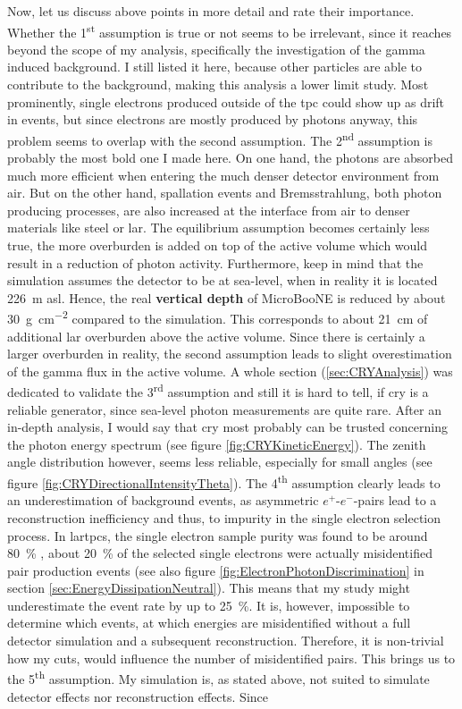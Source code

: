 Now, let us discuss above points in more detail and rate their importance. Whether the 1\textsuperscript{st} assumption is true or not seems to be irrelevant, since it reaches beyond the scope of my analysis, specifically the investigation of the gamma induced background. I still listed it here, because other particles are able to contribute to the background, making this analysis a lower limit study. Most prominently, single electrons produced outside of the \gls{tpc} could show up as drift in events, but since electrons are mostly produced by photons anyway, this problem seems to overlap with the second assumption. The 2\textsuperscript{nd} assumption is probably the most bold one I made here. On one hand, the photons are absorbed much more efficient when entering the much denser detector environment from air. But on the other hand, spallation events and Bremsstrahlung, both photon producing processes, are also increased at the interface from air to denser materials like steel or \gls{lar}. The equilibrium assumption becomes certainly less true, the more overburden is added on top of the active volume which would result in a reduction of photon activity. Furthermore, keep in mind that the simulation assumes the detector to be at sea-level, when in reality it is located \SI{226}{\metre} \gls{asl}. Hence, the real \textbf{vertical depth} of MicroBooNE is reduced by about \SI{30}{\gram\per\centi\metre\squared} compared to the simulation. This corresponds to about \SI{21}{\centi\metre} of additional \gls{lar} overburden above the active volume. Since there is certainly a larger overburden in reality, the second assumption leads to slight overestimation of the gamma flux in the active volume. A whole section (\ref{sec:CRYAnalysis}) was dedicated to validate the 3\textsuperscript{rd} assumption and still it is hard to tell, if \gls{cry} is a reliable generator, since sea-level photon measurements are quite rare. After an in-depth analysis, I would say that \gls{cry} most probably can be trusted concerning the photon energy spectrum (see figure \ref{fig:CRYKineticEnergy}). The zenith angle distribution however, seems less reliable, especially for small angles (see figure \ref{fig:CRYDirectionalIntensityTheta}). The 4\textsuperscript{th} assumption clearly leads to an underestimation of background events, as asymmetric $e^+$-$e^-$-pairs lead to a reconstruction inefficiency and thus, to impurity in the single electron selection process. In \glspl{lartpc}, the single electron sample purity was found to be around \SI{80}{\percent} \cite{LArTPCElectronPhotonDiscrimination}, \ie about \SI{20}{\percent} of the selected single electrons were actually misidentified pair production events (see also figure \ref{fig:ElectronPhotonDiscrimination} in section \ref{sec:EnergyDissipationNeutral}). This means that my study might underestimate the event rate by up to \SI{25}{\percent}. It is, however, impossible to determine which events, at which energies are misidentified without a full detector simulation and a subsequent reconstruction. Therefore, it is non-trivial how my cuts, would influence the number of misidentified pairs. This brings us to the 5\textsuperscript{th} assumption. My simulation is, as stated above, not suited to simulate detector effects nor reconstruction effects. Since 
